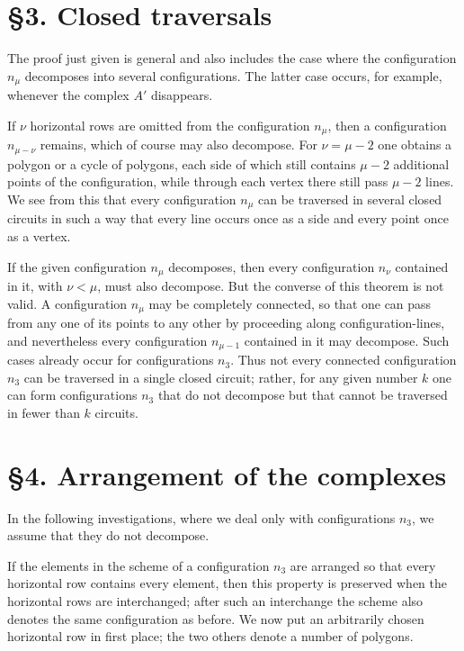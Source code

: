 \documentclass[11pt]{article}
\begin{document}
\section*{\S 3. Closed traversals}
The proof just given is general and also includes the case where the configuration $n_\mu$ decomposes into several configurations. The latter case occurs, for example, whenever the complex $A'$ disappears.

If $\nu$ horizontal rows are omitted from the configuration $n_\mu$, then a configuration $n_{\mu-\nu}$ remains, which of course may also decompose. For $\nu=\mu-2$ one obtains a polygon or a cycle of polygons, each side of which still contains $\mu-2$ additional points of the configuration, while through each vertex there still pass $\mu-2$ lines. We see from this that every configuration $n_\mu$ can be traversed in several closed circuits in such a way that every line occurs once as a side and every point once as a vertex.

If the given configuration $n_\mu$ decomposes, then every configuration $n_\nu$ contained in it, with $\nu<\mu$, must also decompose. But the converse of this theorem is not valid. A configuration $n_\mu$ may be completely connected, so that one can pass from any one of its points to any other by proceeding along configuration-lines, and nevertheless every configuration $n_{\mu-1}$ contained in it may decompose. Such cases already occur for configurations $n_3$. Thus not every connected configuration $n_3$ can be traversed in a single closed circuit; rather, for any given number $k$ one can form configurations $n_3$ that do not decompose but that cannot be traversed in fewer than $k$ circuits.

\section*{\S 4. Arrangement of the complexes}
In the following investigations, where we deal only with configurations $n_3$, we assume that they do not decompose.

If the elements in the scheme of a configuration $n_3$ are arranged so that every horizontal row contains every element, then this property is preserved when the horizontal rows are interchanged; after such an interchange the scheme also denotes the same configuration as before. We now put an arbitrarily chosen horizontal row in first place; the two others denote a number of polygons.
\end{document}
